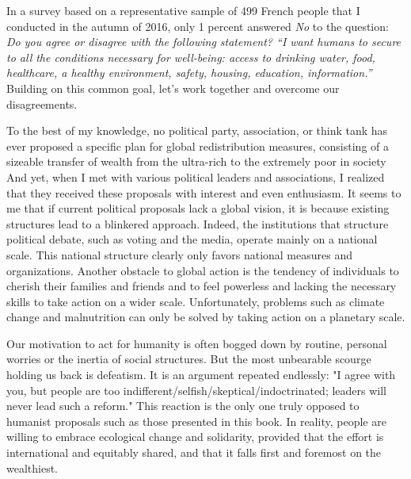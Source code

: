 \documentclass[a5paper,english,openany]{memoir}
\begin{document}
In a survey based on a representative sample of 499 
French people that %
I conducted in the autumn of 2016, only 1 percent %
answered \textit{No} to the question: \textit{Do you agree or disagree with the following statement? ``I want humans to secure to all the conditions necessary for well-being: access to drinking water, food, healthcare, a healthy environment, safety, housing, education, information.''}
Building on this common goal, let's work together and overcome our disagreements.

To the best of my knowledge, no political party, association, %
or think tank has ever proposed a specific plan for global redistribution measures, consisting of a sizeable transfer of wealth from the ultra-rich to the extremely poor in society %
And yet, when I met with various political leaders and associations, I realized %
that they received these proposals with interest and  even enthusiasm. It seems to me that if current political proposals lack a global vision, it is because existing structures lead to a blinkered approach. %
Indeed, the institutions that structure political debate, such as voting and the media, operate mainly %
on a national scale. %
This national structure clearly only favors %
national measures and organizations. %
Another obstacle to global action is the tendency of individuals to cherish their families and friends %
and to feel powerless and lacking the necessary skills %
to take action on a wider scale.
Unfortunately, problems such as climate change and malnutrition can only be solved by taking action on a planetary scale. 

Our motivation to act for humanity is often bogged down by routine, personal worries or the inertia of social structures. %
But the most unbearable scourge holding us back is defeatism. It is an %
argument repeated endlessly: %
"I agree with you, but people are too indifferent/selfish/skeptical/indoctrinated; %
leaders will never lead such a reform." %
This reaction is the only one truly opposed to humanist proposals such as %
those presented in this book. 
In reality, people are willing to embrace ecological change and solidarity, provided that the effort is international and equitably shared, and that it falls first and foremost on the wealthiest. %
\end{document}
